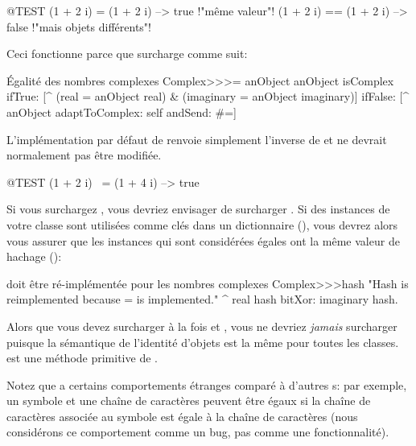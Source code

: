 \documentclass[a4paper,10pt,twoside]{book}
\begin{document}
\begin{code}{@TEST}
(1 + 2 i) = (1 + 2 i)   --> true     !"même valeur"!
(1 + 2 i) == (1 + 2 i)  --> false    !"mais objets différents"!
\end{code}

Ceci fonctionne parce que  surcharge \ct{=} comme suit:

\begin{method}{Égalité des nombres complexes}
Complex>>>= anObject
    anObject isComplex
        ifTrue: [^ (real = anObject real) & (imaginary = anObject imaginary)]
        ifFalse: [^ anObject adaptToComplex: self andSend: #=]
\end{method}

L'implémentation par défaut de  renvoie simplement l'inverse 
de  et ne devrait normalement pas être modifiée.

\begin{code}{@TEST}
(1 + 2 i) ~= (1 + 4 i) --> true
\end{code}

Si vous surchargez \ct{=}, vous devriez envisager de surcharger
. Si des instances de votre classe sont
utilisées comme clés dans un dictionnaire (),
vous devrez alors vous assurer que les instances qui sont
considérées égales ont la même valeur de hachage ():

\begin{method}{ doit être ré-implémentée pour les nombres complexes}
Complex>>>hash
    "Hash is reimplemented because = is implemented."
    ^ real hash bitXor: imaginary hash.
\end{method}

Alors que vous devez surcharger à la fois \ct{=} et , vous
ne devriez \emph{jamais} surcharger \ct{==} puisque la sémantique de 
l'identité d'objets est la même pour toutes les classes.  \ct{==} est une 
méthode primitive de .

Notez que \pharo a certains comportements étranges comparé à d'autres \st{}s: 
par exemple, un symbole et une chaîne de caractères peuvent être égaux si 
la chaîne de caractères associée au symbole est égale à la chaîne de caractères 
(nous considérons ce comportement comme un bug, pas comme une fonctionnalité).
\end{document}

